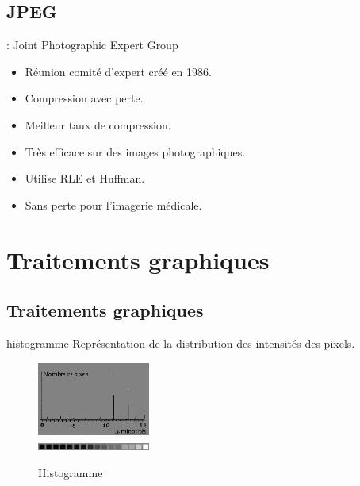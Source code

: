 \documentclass[14pt]{beamer}
\begin{document}
\subsection{JPEG}
\begin{frame}{\subsecname : Joint Photographic Expert Group}
\begin{itemize}
\item Réunion comité d'expert créé en 1986.
\item Compression avec perte. 
\item Meilleur taux de compression.
\item Très efficace sur des images photographiques.
\item Utilise RLE et Huffman.
\item Sans perte pour l'imagerie médicale.
\end{itemize}
\end{frame}



\section{Traitements graphiques}
\subsection{Traitements graphiques}
\begin{frame}{\subsecname}
\begin{block}{histogramme}
Représentation de la distribution des intensités des pixels.
\end{block}

\begin{figure}
\centering
\includegraphics[width=140px]{image_histogramme}\\
\includegraphics[width=140px]{image_palette}
\caption{Histogramme}
\end{figure}
\end{frame}
\end{document}
